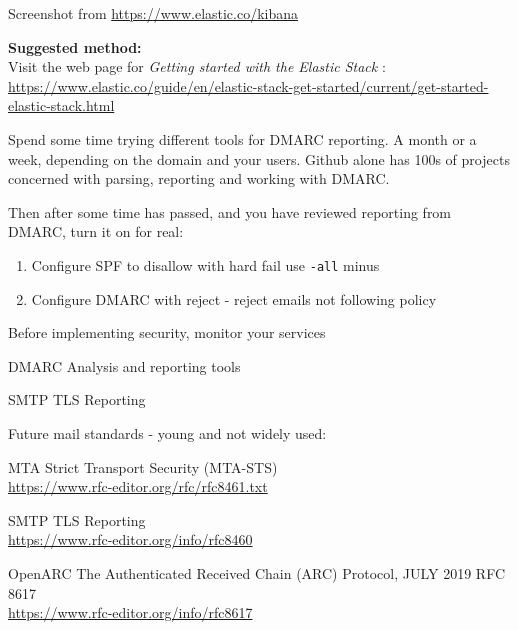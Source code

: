 \documentclass[Screen16to9,17pt]{foils}
\begin{document}


Screenshot from \url{https://www.elastic.co/kibana}

{\bf Suggested method:}\\
Visit the web page for \emph{Getting started with the Elastic Stack} :\\
{\footnotesize\url{https://www.elastic.co/guide/en/elastic-stack-get-started/current/get-started-elastic-stack.html}}



Spend some time trying different tools for DMARC reporting. A month or a week, depending on the domain and your users. Github alone has 100s of projects concerned with parsing, reporting and working with DMARC.

Then after some time has passed, and you have reviewed reporting from DMARC, turn it on for real:
\begin{enumerate}
\item Configure SPF to disallow with hard fail use \verb+-all+ minus
\item Configure DMARC with reject - reject emails not following policy
\end{enumerate}


\begin{list2}
\item Before implementing security, monitor your services
\item DMARC Analysis and reporting tools
\item SMTP TLS Reporting
\end{list2}



Future mail standards - young and not widely used:
\begin{list2}
\item MTA Strict Transport Security (MTA-STS)\\
\url{https://www.rfc-editor.org/rfc/rfc8461.txt}
\item SMTP TLS Reporting\\
\url{https://www.rfc-editor.org/info/rfc8460}
\item OpenARC The Authenticated Received Chain (ARC) Protocol, JULY 2019 RFC 8617\\
\url{https://www.rfc-editor.org/info/rfc8617}
\end{list2}
\end{document}
